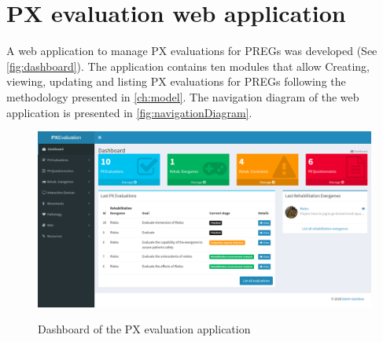 \chapter{PX evaluation web application}
\label{ap:web_app}

A web application to manage \ac{PX} evaluations for \acp{PREG} was developed (See \autoref{fig:dashboard}). The application contains ten modules that allow Creating, viewing, updating and listing \ac{PX} evaluations for \acp{PREG} following the methodology presented in \autoref{ch:model}. The navigation diagram of the web application is presented in \autoref{fig:navigationDiagram}.

\begin{figure}[bth]
\myfloatalign
{\includegraphics[width=\linewidth]{gfx/app/dashboard}} \quad
\caption{Dashboard of the \ac{PX} evaluation application}\label{fig:dashboard}
\end{figure}

